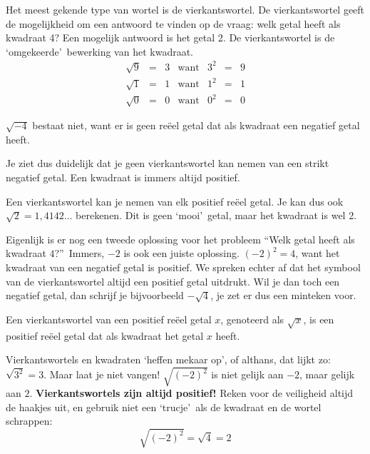 Het meest gekende type van wortel is de vierkantswortel. De vierkantswortel geeft de mogelijkheid om een antwoord te vinden op de vraag: welk getal heeft als kwadraat 4? Een mogelijk antwoord is het getal 2. De vierkantswortel is de \textquoteleft omgekeerde\textquoteright \ bewerking van het kwadraat.
\begin{equation*}
\begin{array}{ccccccc}
\sqrt{9} &=& 3 & \text{want} & 3^2 &=& 9 \\
\sqrt{1} &=& 1 & \text{want} & 1^2 &=& 1 \\
\sqrt{0} &=& 0 & \text{want} & 0^2 &=& 0 
\end{array}
\end{equation*}

$\sqrt{-4}$ bestaat niet, want er is geen re\"eel getal dat als kwadraat een negatief getal heeft.

Je ziet dus duidelijk dat je geen vierkantswortel kan nemen van een strikt negatief getal. Een kwadraat is immers altijd positief.

Een vierkantswortel kan je nemen van elk positief re\"eel getal. Je kan dus ook $\sqrt{2}=1,4142\ldots$ berekenen. 
Dit is geen \textquoteleft mooi\textquoteright \ getal, maar het kwadraat is wel 2.

Eigenlijk is er nog een tweede oplossing voor het probleem \textquotedblleft Welk getal heeft als kwadraat $4$?\textquotedblright\ 
Immers, $-2$ is ook een juiste oplossing. $(-2)^2=4$, want het kwadraat van een negatief getal is positief. We spreken echter af dat het symbool van de vierkantswortel altijd een positief getal uitdrukt. Wil je dan toch een negatief getal, dan schrijf je bijvoorbeeld $-\sqrt{4}$, je zet er dus een minteken voor.


\begin{definitie}
	Een vierkantswortel van een positief re\"eel getal $x$, genoteerd als $\sqrt{x}$, is een positief re\"eel getal dat als kwadraat het getal $x$ heeft.
\end{definitie}

Vierkantswortels en kwadraten \textquoteleft heffen mekaar op\textquoteright, of althans, dat lijkt zo: $\sqrt{3^2}=3$. Maar laat je niet vangen! $\sqrt{(-2)^2}$ is niet gelijk aan $-2$, maar gelijk aan $2$. \textbf{Vierkantswortels zijn altijd positief!} Reken voor de veiligheid altijd de haakjes uit, en gebruik niet een \textquoteleft trucje\textquoteright\ als de kwadraat en de wortel schrappen:
\begin{equation*}
\sqrt{(-2)^2}=\sqrt{4}=2
\end{equation*}

